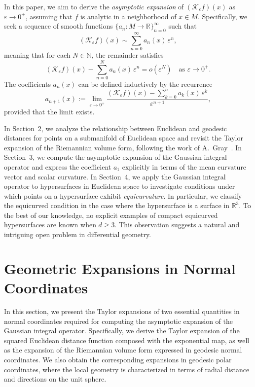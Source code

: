 \documentclass{amsart}
\theoremstyle{Theorem}
\theoremstyle{remark}
\numberwithin{equation}{section} \numberwithin{figure}{section}
\renewcommand*{\to}{\rightarrow}
\begin{document}
In this paper, we aim to derive the \emph{asymptotic expansion} of \( (\mathcal{K}_\varepsilon f)(x) \) as \( \varepsilon \to 0^+ \), assuming that \( f \) is analytic in a neighborhood of \( x \in M \). Specifically, we seek a sequence of smooth functions \( \{a_n : M \to \mathbb{R}\}_{n=0}^{\infty} \) such that
\[
(\mathcal{K}_\varepsilon f)(x) \sim \sum_{n=0}^{\infty} a_n(x) \, \varepsilon^n,
\]
meaning that for each \( N \in \mathbb{N} \), the remainder satisfies
\[
(\mathcal{K}_\varepsilon f)(x) - \sum_{n=0}^{N} a_n(x) \, \varepsilon^n = o(\varepsilon^N) \quad \text{as } \varepsilon \to 0^+.
\]
The coefficients \( a_n(x) \) can be defined inductively by the recurrence
\[
a_{n+1}(x) := \lim_{\varepsilon \to 0^+} \frac{(\mathcal{K}_\varepsilon f)(x) - \sum_{k=0}^{n} a_k(x) \, \varepsilon^k}{\varepsilon^{n+1}},
\]
provided that the limit exists.

In Section~2, we analyze the relationship between Euclidean and geodesic distances for points on a submanifold of Euclidean space and revisit the Taylor expansion of the Riemannian volume form, following the work of A.~Gray~\cite{AG}.  
In Section~3, we compute the asymptotic expansion of the Gaussian integral operator and express the coefficient \( a_1 \) explicitly in terms of the mean curvature vector and scalar curvature.  
In Section~4, we apply the Gaussian integral operator to hypersurfaces in Euclidean space to investigate conditions under which points on a hypersurface exhibit \emph{equicurvature}. In particular, we classify the equicurved condition in the case where the hypersurface is a surface in \( \mathbb{R}^3 \). To the best of our knowledge, no explicit examples of compact equicurved hypersurfaces are known when \( d \geq 3 \). This observation suggests a natural and intriguing open problem in differential geometry.


\section{Geometric Expansions in Normal Coordinates}
In this section, we present the Taylor expansions of two essential quantities in normal coordinates required for computing the asymptotic expansion of the Gaussian integral operator. Specifically, we derive the Taylor expansion of the squared Euclidean distance function composed with the exponential map, as well as the expansion of the Riemannian volume form expressed in geodesic normal coordinates. We also obtain the corresponding expansions in geodesic polar coordinates, where the local geometry is characterized in terms of radial distance and directions on the unit sphere.
\end{document}
